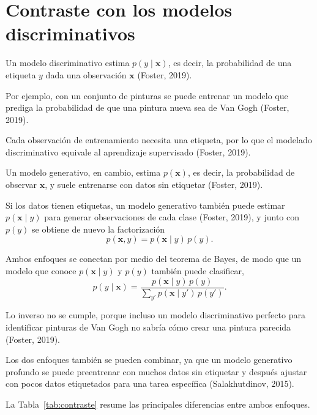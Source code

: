 \documentclass[11pt,letterpaper]{article}
\theoremstyle{definition}
\newcommand{\bx}{\mathbf{x}}
\begin{document}
\section{Contraste con los modelos discriminativos}

Un modelo discriminativo estima $p(y \mid \bx)$, es decir, la probabilidad de una etiqueta $y$ dada una observación $\bx$ (Foster, 2019).

Por ejemplo, con un conjunto de pinturas se puede entrenar un modelo que prediga la probabilidad de que una pintura nueva sea de Van Gogh (Foster, 2019).

Cada observación de entrenamiento necesita una etiqueta, por lo que el modelado discriminativo equivale al aprendizaje supervisado (Foster, 2019).

Un modelo generativo, en cambio, estima $p(\bx)$, es decir, la probabilidad de observar $\bx$, y suele entrenarse con datos sin etiquetar (Foster, 2019).

Si los datos tienen etiquetas, un modelo generativo también puede estimar $p(\bx \mid y)$ para generar observaciones de cada clase (Foster, 2019), y junto con $p(y)$ se obtiene de nuevo la factorización
\begin{equation}
  p(\bx, y) = p(\bx \mid y)\, p(y).
\end{equation}

Ambos enfoques se conectan por medio del teorema de Bayes, de modo que un modelo que conoce $p(\bx \mid y)$ y $p(y)$ también puede clasificar,
\begin{equation}
  p(y \mid \bx) = \frac{p(\bx \mid y)\, p(y)}{\sum_{y'} p(\bx \mid y')\, p(y')}.
\end{equation}

Lo inverso no se cumple, porque incluso un modelo discriminativo perfecto para identificar pinturas de Van Gogh no sabría cómo crear una pintura parecida (Foster, 2019).

Los dos enfoques también se pueden combinar, ya que un modelo generativo profundo se puede preentrenar con muchos datos sin etiquetar y después ajustar con pocos datos etiquetados para una tarea específica (Salakhutdinov, 2015).

La Tabla~\ref{tab:contraste} resume las principales diferencias entre ambos enfoques.
\end{document}
